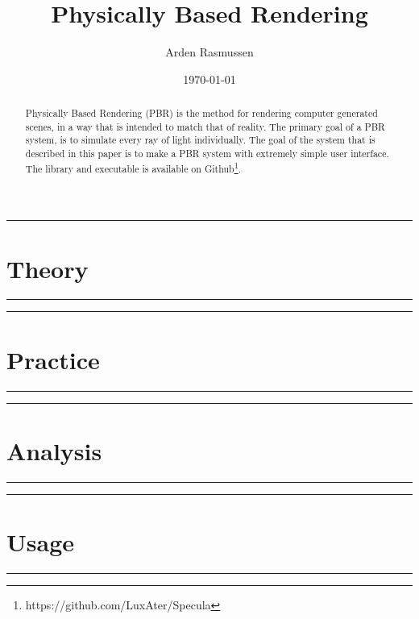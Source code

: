 \documentclass[10pt]{armath}
\title{Physically Based Rendering}
\author{Arden Rasmussen}
\date{\today}
\numberwithin{equation}{section}
\newcommand{\hdiv}[3]{
  \vspace{#1}%
  \noindent\rule{\textwidth}{#2}%
  \vspace{#3}%
}
\begin{document}
\maketitle

\begin{abstract}
  Physically Based Rendering (PBR) is the method for rendering computer
  generated scenes, in a way that is intended to match that of reality. The
  primary goal of a PBR system, is to simulate every ray of light individually.
  The goal of the system that is described in this paper is to make a PBR
  system with extremely simple user interface. The library and executable is
  available on Github\footnote{https://github.com/LuxAter/Specula}.
\end{abstract}

\newpage
\hdiv{10pt}{0.5pt}{1pt}
\part{Theory}%
\label{prt:theory}
\hdiv{1pt}{0.5pt}{10pt}

\newpage
\hdiv{10pt}{0.5pt}{1pt}
\part{Practice}%
\label{prt:practice}
\hdiv{1pt}{0.5pt}{10pt}



\newpage
\hdiv{10pt}{0.5pt}{1pt}
\part{Analysis}%
\label{prt:Analysis}
\hdiv{1pt}{0.5pt}{10pt}

\newpage
\hdiv{10pt}{0.5pt}{1pt}
\part{Usage}%
\label{prt:Usage}
\hdiv{1pt}{0.5pt}{10pt}



\end{document}
